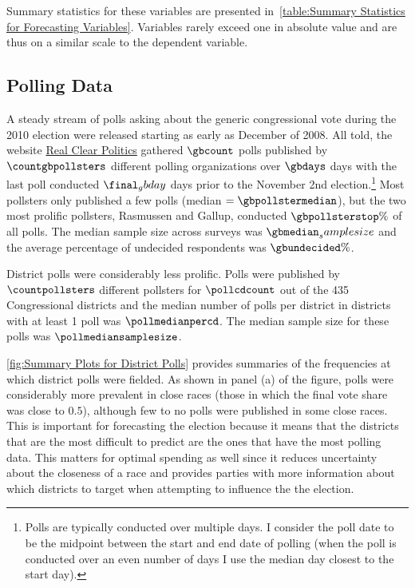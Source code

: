 \documentclass[12pt,final,fleqn]{article}
\theoremstyle{plain}
\begin{document}
Summary statistics for these variables are presented in~\autoref{table:Summary Statistics for Forecasting Variables}. Variables rarely exceed one in absolute value and are thus on a similar scale to the dependent variable.

\subsection{Polling Data}
A steady stream of polls asking about the generic congressional vote during the 2010 election were released starting as early as December of 2008. All told, the website \href{http://www.realclearpolitics.com/}{Real Clear Politics} gathered  $\gbcount$ polls published by $\countgbpollsters$ different polling organizations over $\gbdays$ days with the last poll conducted $\final_gbday$ days prior to the November 2nd election.\footnote{Polls are typically conducted over multiple days. I consider the poll date to be the midpoint between the start and end date of polling (when the poll is conducted over an even number of days I use the median day closest to the start day).} Most pollsters only published a few polls (median $= \gbpollstermedian$), but the two most prolific pollsters,  Rasmussen and Gallup, conducted $\gbpollsterstop\%$ of all polls. The median sample size across surveys was $\gbmedian_samplesize$ and the average percentage of undecided respondents was $\gbundecided\%$.

District polls were considerably less prolific. Polls were published by $\countpollsters$ different pollsters for $\pollcdcount$ out of the 435 Congressional districts and the median number of polls per district in districts with at least 1 poll was $\pollmedianpercd$. The median sample size for these polls was $\pollmediansamplesize$. 

\autoref{fig:Summary Plots for District Polls} provides summaries of the frequencies at which district polls were fielded. As shown in panel (a) of the figure, polls were considerably more prevalent in close races (those in which the final vote share was close to $0.5$), although few to no polls were published in some close races. This is important for forecasting the election because it means that the districts that are the most difficult to predict are the ones that have the most polling data. This matters for optimal spending as well since it reduces uncertainty about the closeness of a race and provides parties with more information about which districts to target when attempting to influence the the election.
\end{document}

